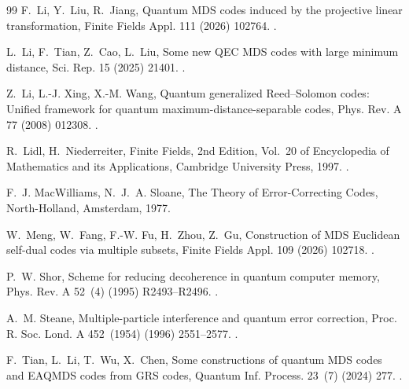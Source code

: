 \documentclass[preprint,12pt,a4paper]{elsarticle}
\begin{document}
\begin{thebibliography}{99}
F.~Li, Y.~Liu, R.~Jiang, Quantum {MDS} codes induced by the projective linear
  transformation, Finite Fields Appl. 111 (2026) 102764.
\newblock \href {https://doi.org/10.1016/j.ffa.2025.102764}
  {}.

L.~Li, F.~Tian, Z.~Cao, L.~Liu, Some new {QEC} {MDS} codes with large minimum
  distance, Sci. Rep. 15 (2025) 21401.
\newblock \href {https://doi.org/10.1038/s41598-025-06092-9}
  {}.

Z.~Li, L.-J. Xing, X.-M. Wang, Quantum generalized {Reed--Solomon} codes:
  Unified framework for quantum maximum-distance-separable codes, Phys. Rev. A 77 (2008) 012308.
\newblock \href {https://doi.org/10.1103/PhysRevA.77.012308}
  {}.

R.~Lidl, H.~Niederreiter, Finite Fields, 2nd Edition, Vol.~20 of Encyclopedia
  of Mathematics and its Applications, Cambridge University Press, 1997.
\newblock \href {https://doi.org/10.1017/CBO9780511525926}
  {}.

F.~J. MacWilliams, N.~J.~A. Sloane, The Theory of Error-Correcting Codes,
  North-Holland, Amsterdam, 1977.

W.~Meng, W.~Fang, F.-W. Fu, H.~Zhou, Z.~Gu, Construction of {MDS} {Euclidean}
  self-dual codes via multiple subsets, Finite Fields Appl.
  109 (2026) 102718.
\newblock \href {https://doi.org/10.1016/j.ffa.2025.102718}
  {}.

P.~W. Shor, Scheme for reducing decoherence in quantum computer memory,
  Phys. Rev. A 52~(4) (1995) R2493--R2496.
\newblock \href {https://doi.org/10.1103/PhysRevA.52.R2493}
  {}.

A.~M. Steane, Multiple-particle interference and quantum error correction,
  Proc. R. Soc. Lond. A 452~(1954) (1996) 2551--2577.
\newblock \href {https://doi.org/10.1098/rspa.1996.0136}
  {}.

F.~Tian, L.~Li, T.~Wu, X.~Chen, Some constructions of quantum {MDS} codes and
  {EAQMDS} codes from {GRS} codes, Quantum Inf. Process. 23~(7) (2024)
  277.
\newblock \href {https://doi.org/10.1007/s11128-024-04487-7}
  {}.


\end{thebibliography}
\end{document}
